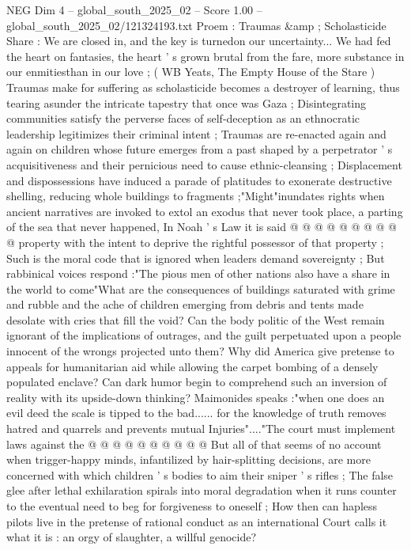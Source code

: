 \begin{textsample}{NEG Dim 4 – global\_south\_2025\_02 – Score 1.00 – global\_south\_2025\_02/121324193.txt}  \label{ex:f4_neg_438}
Proem : Traumas \&amp ; Scholasticide Share : We are closed in, and the key is turnedon our uncertainty...
We had fed the heart on fantasies, the heart ' s grown brutal from the fare, more substance in our enmitiesthan in our love ; ( WB Yeats, The Empty House of the Stare ) Traumas make for suffering as scholasticide becomes a destroyer of learning, thus tearing asunder the intricate tapestry that once was Gaza ; Disintegrating communities satisfy the perverse faces of self-deception as an ethnocratic leadership legitimizes their criminal intent ; Traumas are re-enacted again and again on children whose future emerges from a past shaped by a perpetrator ' s acquisitiveness and their pernicious need to cause ethnic-cleansing ; Displacement and dispossessions have induced a parade of platitudes to exonerate destructive shelling, reducing whole buildings to fragments ;"Might"inundates rights when ancient narratives are invoked to extol an exodus that never took place, a parting of the sea that never happened, In Noah ' s Law it is said @ @ @ @ @ @ @ @ @ @ property with the intent to deprive the rightful possessor of that property ; Such is the moral code that is ignored when leaders demand sovereignty ; But rabbinical voices respond :"The pious men of other nations also have a share in the world to come"What are the consequences of buildings saturated with grime and rubble and the ache of children emerging from debris and tents made desolate with cries that fill the void?
Can the body politic of the West remain ignorant of the implications of outrages, and the guilt perpetuated upon a people innocent of the wrongs projected unto them?
Why did America give pretense to appeals for humanitarian aid while allowing the carpet bombing of a densely populated enclave?
Can dark humor begin to comprehend such an inversion of reality with its upside-down thinking?
Maimonides speaks :"when one does an evil deed the scale is tipped to the bad...... for the knowledge of truth removes hatred and quarrels and prevents mutual Injuries"...."The court must implement laws against the @ @ @ @ @ @ @ @ @ @ But all of that seems of no account when trigger-happy minds, infantilized by hair-splitting decisions, are more concerned with which children ' s bodies to aim their sniper ' s rifles ; The false glee after lethal exhilaration spirals into moral degradation when it runs counter to the eventual need to beg for forgiveness to oneself ; How then can hapless pilots live in the pretense of rational conduct as an international Court calls it what it is : an orgy of slaughter, a willful genocide?

\end{textsample}
